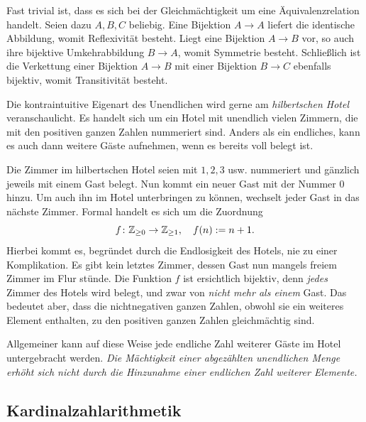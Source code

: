 Fast trivial ist, dass es sich bei der Gleichmächtigkeit um eine
Äquivalenzrelation handelt. Seien dazu $A,B,C$ beliebig. Eine Bijektion
$A\to A$ liefert die identische Abbildung, womit Reflexivität besteht.
Liegt eine Bijektion $A\to B$ vor, so auch ihre bijektive Umkehrabbildung
$B\to A$, womit Symmetrie besteht. Schließlich ist die Verkettung einer
Bijektion $A\to B$ mit einer Bijektion $B\to C$ ebenfalls bijektiv, womit
Transitivität besteht.

Die kontraintuitive Eigenart des Unendlichen wird gerne am
\emph{hilbertschen Hotel} veranschaulicht. Es
handelt sich um ein Hotel mit unendlich vielen Zimmern, die mit den
positiven ganzen Zahlen nummeriert sind. Anders als ein endliches, kann
es auch dann weitere Gäste aufnehmen, wenn es bereits voll belegt ist.

Die Zimmer im hilbertschen Hotel seien mit $1, 2, 3$ usw. nummeriert
und gänzlich jeweils mit einem Gast belegt. Nun kommt ein neuer Gast
mit der Nummer $0$ hinzu. Um auch ihn im Hotel unterbringen zu können,
wechselt jeder Gast in das nächste Zimmer. Formal handelt es sich
um die Zuordnung
\[f\colon\mathbb Z_{\ge 0}\to\mathbb Z_{\ge 1},\quad f(n) := n + 1.\]
Hierbei kommt es, begründet durch die Endlosigkeit des Hotels, nie zu
einer Komplikation. Es gibt kein letztes Zimmer, dessen Gast nun mangels
freiem Zimmer im Flur stünde. Die Funktion $f$ ist ersichtlich bijektiv,
denn \emph{jedes} Zimmer des Hotels wird belegt, und zwar von
\emph{nicht mehr als einem} Gast. Das bedeutet aber, dass die
nichtnegativen ganzen Zahlen, obwohl sie ein weiteres Element enthalten,
zu den positiven ganzen Zahlen gleichmächtig sind.

Allgemeiner kann auf diese Weise jede endliche Zahl weiterer
Gäste im Hotel untergebracht werden. \emph{Die Mächtigkeit einer abgezählten
unendlichen Menge erhöht sich nicht durch die Hinzunahme einer
endlichen Zahl weiterer Elemente.}

\subsection{Kardinalzahlarithmetik}

